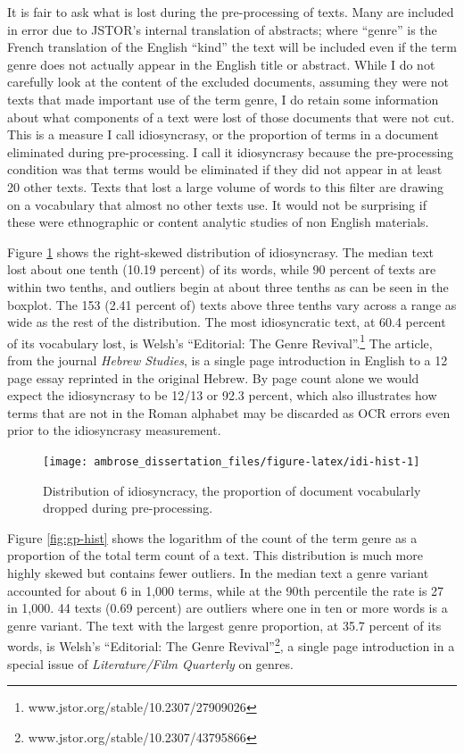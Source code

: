 \documentclass[]{book}
\let\rmarkdownfootnote\footnote%
\def\footnote{\protect\rmarkdownfootnote}
\theoremstyle{definition}
\theoremstyle{definition}
\theoremstyle{definition}
\theoremstyle{remark}
\begin{document}
It is fair to ask what is lost during the pre-processing of texts. Many
are included in error due to JSTOR's internal translation of abstracts;
where ``genre'' is the French translation of the English ``kind'' the
text will be included even if the term genre does not actually appear in
the English title or abstract. While I do not carefully look at the
content of the excluded documents, assuming they were not texts that
made important use of the term genre, I do retain some information about
what components of a text were lost of those documents that were not
cut. This is a measure I call idiosyncrasy, or the proportion of terms
in a document eliminated during pre-processing. I call it idiosyncrasy
because the pre-processing condition was that terms would be eliminated
if they did not appear in at least 20 other texts. Texts that lost a
large volume of words to this filter are drawing on a vocabulary that
almost no other texts use. It would not be surprising if these were
ethnographic or content analytic studies of non English materials.

Figure \ref{fig:idi-hist} shows the right-skewed distribution of
idiosyncrasy. The median text lost about one tenth (10.19 percent) of
its words, while 90 percent of texts are within two tenths, and outliers
begin at about three tenths as can be seen in the boxplot. The 153 (2.41
percent of) texts above three tenths vary across a range as wide as the
rest of the distribution. The most idiosyncratic text, at 60.4 percent
of its vocabulary lost, is Welsh's ``Editorial: The Genre
Revival''.\footnote{www.jstor.org/stable/10.2307/27909026} The article,
from the journal \emph{Hebrew Studies}, is a single page introduction in
English to a 12 page essay reprinted in the original Hebrew. By page
count alone we would expect the idiosyncrasy to be 12/13 or 92.3
percent, which also illustrates how terms that are not in the Roman
alphabet may be discarded as OCR errors even prior to the idiosyncrasy
measurement.

\begin{figure}

{\centering \texttt{[image: ambrose\_dissertation\_files/figure-latex/idi-hist-1]} 

}

\caption{Distribution of idiosyncracy, the proportion of document vocabularly dropped during pre-processing.}\label{fig:idi-hist}
\end{figure}

Figure \ref{fig:gp-hist} shows the logarithm of the count of the term
genre as a proportion of the total term count of a text. This
distribution is much more highly skewed but contains fewer outliers. In
the median text a genre variant accounted for about 6 in 1,000 terms,
while at the 90th percentile the rate is 27 in 1,000. 44 texts (0.69
percent) are outliers where one in ten or more words is a genre variant.
The text with the largest genre proportion, at 35.7 percent of its
words, is Welsh's ``Editorial: The Genre Revival''\footnote{www.jstor.org/stable/10.2307/43795866},
a single page introduction in a special issue of \emph{Literature/Film
Quarterly} on genres.
\end{document}
